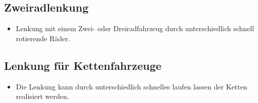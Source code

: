 \subsection{Zweiradlenkung}
\begin{itemize}	
\item Lenkung mit einem Zwei- oder Dreiradfahrzeug durch unterschiedlich schnell rotierende Räder.\\
\end{itemize}
\subsection{Lenkung für Kettenfahrzeuge}
\begin{itemize}	
\item Die Lenkung kann durch unterschiedlich schnelles laufen lassen der Ketten realisiert werden.\\
\end{itemize}